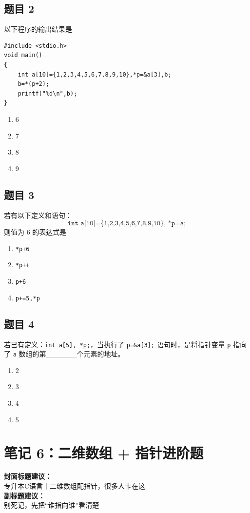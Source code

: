\documentclass[12pt,a4paper]{ctexart}
\begin{document}
\subsection*{题目 2}
以下程序的输出结果是
\begin{lstlisting}
#include <stdio.h>
void main()
{
    int a[10]={1,2,3,4,5,6,7,8,9,10},*p=&a[3],b;
    b=*(p+2);
    printf("%d\n",b);
}
\end{lstlisting}

\begin{enumerate}[label=\Alph*.]
    \item 6
    \item 7
    \item 8
    \item 9
\end{enumerate}

\subsection*{题目 3}
若有以下定义和语句：
\[
	\texttt{int a[10]=\{1,2,3,4,5,6,7,8,9,10\}, *p=a;}
\]
则值为 6 的表达式是
\begin{enumerate}[label=\Alph*.]
	\item \texttt{*p+6}
	\item \texttt{*p++}
	\item \texttt{p+6}
	\item \texttt{p+=5,*p}
\end{enumerate}

\subsection*{题目 4}
若已有定义：\texttt{int a[5], *p;}，当执行了 \texttt{p=\&a[3];} 语句时，是将指针变量 \texttt{p} 指向了 \texttt{a} 数组的第\_\_\_\_\_\_个元素的地址。
\begin{enumerate}[label=\Alph*.]
    \item 2
    \item 3
    \item 4
    \item 5
\end{enumerate}

\newpage

\section{笔记 6：二维数组 + 指针进阶题}
\begin{coverbox}
\textbf{封面标题建议：}\\
专升本C语言｜二维数组配指针，很多人卡在这\\
\textbf{副标题建议：}\\
别死记，先把“谁指向谁”看清楚
\end{coverbox}
\end{document}
